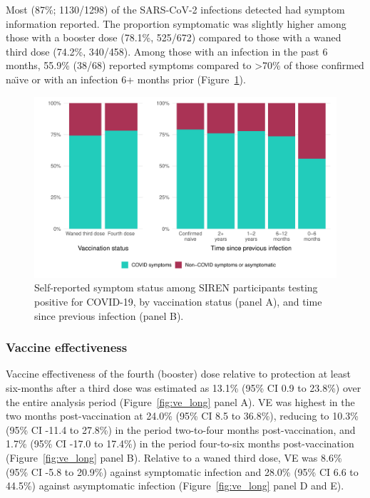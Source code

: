 Most (87\%; 1130/1298) of the SARS-CoV-2 infections detected had symptom information reported. The proportion symptomatic was slightly higher among those with a booster dose (78.1\%, 525/672) compared to those with a waned third dose (74.2\%, 340/458). Among those with an infection in the past 6 months, 55.9\% (38/68) reported symptoms compared to >70\% of those confirmed na\"{\i}ve or with an infection 6+ months prior (Figure~\ref{fig:symptoms_vaccine_tsp}).

\begin{figure}[htbp!]
    \centering
    \includegraphics[width=\textwidth]{symptoms_vaccine_tsp.pdf}
    \caption[Self-reported symptom status among SIREN participants testing positive for COVID-19, by vaccination status, and time since previous infection]{Self-reported symptom status among SIREN participants testing positive for COVID-19, by vaccination status (panel A), and time since previous infection (panel B).}\label{fig:symptoms_vaccine_tsp}
\end{figure}

\subsubsection{Vaccine effectiveness}

Vaccine effectiveness of the fourth (booster) dose relative to protection at least six-months after a third dose was estimated as 13.1\% (95\% CI 0.9 to 23.8\%) over the entire analysis period (Figure~\ref{fig:ve_long} panel A). VE was highest in the two months post-vaccination at 24.0\% (95\% CI 8.5 to 36.8\%), reducing to 10.3\% (95\% CI -11.4 to 27.8\%) in the period two-to-four months post-vaccination, and 1.7\% (95\% CI -17.0 to 17.4\%) in the period four-to-six months post-vaccination (Figure~\ref{fig:ve_long} panel B). Relative to a waned third dose, VE was 8.6\% (95\% CI -5.8 to 20.9\%) against symptomatic infection and 28.0\% (95\% CI 6.6 to 44.5\%) against asymptomatic infection (Figure~\ref{fig:ve_long} panel D and E).

